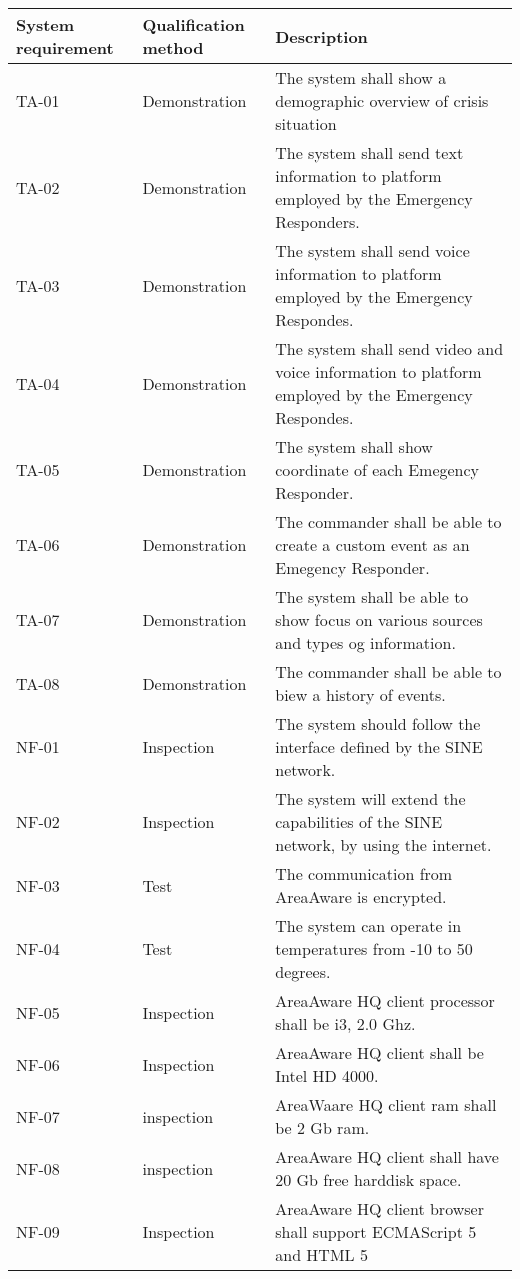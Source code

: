 \begin{longtable}{| p{2.4cm}  | p{2.6cm} | p{6.6cm} |  }
	\hline
	\textbf{System requirement}	& \textbf{Qualification method} & \textbf{Description} \\ \hline
	TA-01	& Demonstration	& The system shall show a demographic overview of crisis situation \\ \hline
	TA-02	& Demonstration	& The system shall send text information to platform employed by the Emergency Responders. \\ \hline
	TA-03	& Demonstration	& The system shall send voice information to platform employed by the Emergency Respondes. \\ \hline
	TA-04	& Demonstration	& The system shall send video and voice information to platform employed by the Emergency Respondes. \\ \hline
	TA-05	& Demonstration	& The system shall show coordinate of each Emegency Responder. \\ \hline
	TA-06	& Demonstration	& The commander shall be able to create a custom event as an Emegency Responder. \\ \hline
	TA-07	& Demonstration	& The system shall be able to show focus on various sources and types og information. \\ \hline
	TA-08	& Demonstration	& The commander shall be able to biew a history of events. \\ \hline
	NF-01	& Inspection	& The system should follow the interface defined by the SINE network. \\ \hline
	NF-02	& Inspection	& The system will extend the capabilities of the SINE network, by using the internet. \\ \hline
	NF-03	& Test			& The communication from AreaAware is encrypted. \\ \hline
	NF-04	& Test			& The system can operate in temperatures from -10 to 50 degrees. \\ \hline
	NF-05	& Inspection	& AreaAware HQ client processor shall be i3, 2.0 Ghz. \\ \hline
	NF-06	& Inspection	& AreaAware HQ client shall be Intel HD 4000. \\ \hline
	NF-07	& inspection	& AreaWaare HQ client ram shall be 2 Gb ram. \\ \hline
	NF-08	& inspection	& AreaAware HQ client shall have 20 Gb free harddisk space. \\ \hline
	NF-09	& Inspection	& AreaAware HQ client browser shall support ECMAScript 5 and HTML 5 \\ \hline

\end{longtable}
